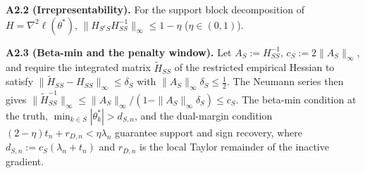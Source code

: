 \documentclass[11pt,a4paper]{article}
\theoremstyle{remark}
\begin{document}
\textbf{A2.2 (Irrepresentability).} For the support block decomposition of
$H=\nabla^2\ell(\theta^*)$,
$\|H_{S^cS}H_{SS}^{-1}\|_\infty\le1-\eta$ ($\eta\in(0,1)$).

\textbf{A2.3 (Beta-min and the penalty window).} Let $A_S:=H_{SS}^{-1}$,
$c_S:=2\|A_S\|_\infty$, and require the integrated matrix $\widetilde H_{SS}$ of the
restricted empirical Hessian to satisfy $\|\widetilde H_{SS}-H_{SS}\|_\infty\le\delta_S$
with $\|A_S\|_\infty\delta_S\le\frac12$. The Neumann series then gives
$\|\widetilde H_{SS}^{-1}\|_\infty\le\|A_S\|_\infty/(1-\|A_S\|_\infty\delta_S)\le c_S$. The
beta-min condition at the truth, $\min_{k\in S}|\theta_k^*|>d_{S,n}$, and the dual-margin
condition $(2-\eta)t_n+r_{D,n}<\eta\lambda_n$ guarantee support and sign recovery, where
$d_{S,n}:=c_S(\lambda_n+t_n)$ and $r_{D,n}$ is the local Taylor remainder of the inactive
gradient.
\end{document}
